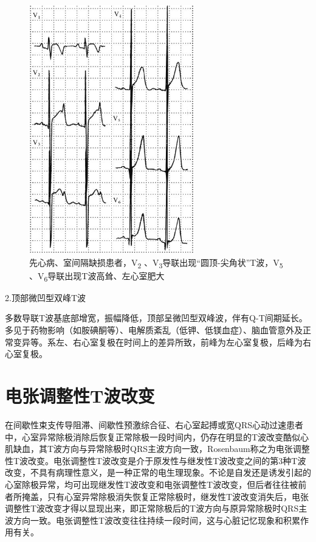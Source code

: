 \begin{figure}[!htbp]
 \centering
 \includegraphics[width=2.82292in,height=4.26042in]{./images/Image00104.jpg}
 \captionsetup{justification=centering}
 \caption{先心病、室间隔缺损患者，V\textsubscript{2} 、V\textsubscript{3}导联出现“圆顶-尖角状”T波，V\textsubscript{5} 、V\textsubscript{6}导联出现T波高耸、左心室肥大}
 \label{fig6-12}
  \end{figure} 


2.顶部微凹型双峰T波

多数导联T波基底部增宽，振幅降低，顶部呈微凹型双峰波，伴有Q-T间期延长。多见于药物影响（如胺碘酮等）、电解质紊乱（低钾、低镁血症）、脑血管意外及正常变异等。系左、右心室复极在时间上的差异所致，前峰为左心室复极，后峰为右心室复极。

\protect\hypertarget{text00012.htmlux5cux23subid95}{}{}

\section{电张调整性T波改变}

在间歇性束支传导阻滞、间歇性预激综合征、右心室起搏或宽QRS心动过速患者中，心室异常除极消除后恢复正常除极一段时间内，仍存在明显的T波改变酷似心肌缺血，其T波方向与异常除极时QRS主波方向一致，Rosenbaum称之为电张调整性T波改变。电张调整性T波改变是介于原发性与继发性T波改变之间的第3种T波改变，不具有病理性意义，是一种正常的电生理现象。不论是自发还是诱发引起的心室除极异常，均可出现继发性T波改变和电张调整性T波改变，但后者往往被前者所掩盖，只有心室异常除极消失恢复正常除极时，继发性T波改变消失后，电张调整性T波改变才得以显现出来，即正常除极后的T波方向与原异常除极时QRS主波方向一致。电张调整性T波改变往往持续一段时间，这与心脏记忆现象和积累作用有关。

